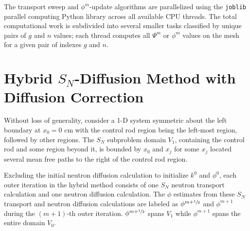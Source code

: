 The transport sweep and $\phi^m$-update algorithms are parallelized using the \texttt{joblib}
parallel computing Python library \cite{noauthor_joblib_nodate} across all available CPU threads.
The total computational work is subdivided into several smaller tasks classified by unique pairs
of $g$ and $n$ values; each thread computes all $\Psi^m$ or $\phi^m$ values on the mesh for a given
pair of indexes $g$ and $n$.

\section{Hybrid $S_N$-Diffusion Method with Diffusion Correction} \label{sec:python-hybrid}

Without loss of generality, consider a 1-D system symmetric about the left boundary at $x_0=0$ cm
with the control rod region being the left-most region, followed by other
regions. The $S_N$ subproblem domain $V_1$, containing the control rod and some region beyond it,
is bounded by $x_0$ and $x_j$ for some $x_j$
located several mean free paths to the right of the control rod region.

Excluding the initial neutron diffusion calculation to initialize $k^0$ and $\phi^0$, each outer
iteration in the hybrid method consists of one $S_N$ neutron transport calculation and one neutron
diffusion calculation. The $\phi$ estimates from these $S_N$ transport and neutron diffusion
calculations are labeled as $\phi^{m+\sfrac{1}{2}}$ and $\phi^{m+1}$ during the
$(m+1)$-th outer iteration. $\phi^{m+\sfrac{1}{2}}$ spans $V_1$ while $\phi^{m+1}$ spans
the entire domain $V_0$.

